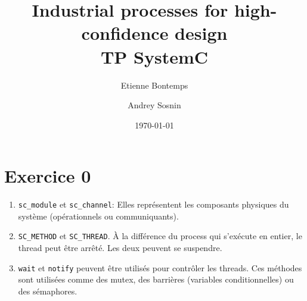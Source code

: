 \documentclass[11pt]{article}
\title{\textbf{Industrial processes for high-confidence design}\\ TP SystemC}
\date{\today}
\author{Etienne Bontemps \and Andrey Sosnin}
\begin{document}
\maketitle

\section*{Exercice 0}
\begin{enumerate}
    \item \texttt{sc\_module} et \texttt{sc\_channel}: Elles représentent les composants physiques du système (opérationnels ou communiquants).
    \item \texttt{SC\_METHOD} et \texttt{SC\_THREAD}. À la différence du process qui s'exécute en entier, le thread peut être arrêté. Les deux peuvent se suspendre.
    \item \texttt{wait} et \texttt{notify} peuvent être utilisés pour contrôler les threads. Ces méthodes sont utilisées comme des mutex, des barrières (variables conditionnelles) ou des sémaphores.
\end{enumerate}
\end{document}
